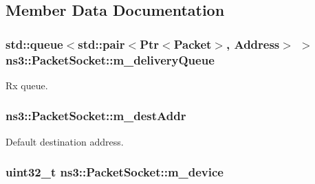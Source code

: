 \subsection{Member Data Documentation}
\subsubsection[{\texorpdfstring{m\+\_\+delivery\+Queue}{m_deliveryQueue}}]{\setlength{\rightskip}{0pt plus 5cm}std\+::queue$<$std\+::pair$<${\bf Ptr}$<${\bf Packet}$>$, {\bf Address}$>$ $>$ ns3\+::\+Packet\+Socket\+::m\+\_\+delivery\+Queue\hspace{0.3cm}{\ttfamily [private]}}\hypertarget{classns3_1_1PacketSocket_a436086ef3cbe575138ad46c14e58aa56}{}\label{classns3_1_1PacketSocket_a436086ef3cbe575138ad46c14e58aa56}


Rx queue. 

\subsubsection[{\texorpdfstring{m\+\_\+dest\+Addr}{m_destAddr}}]{ ns3\+::\+Packet\+Socket\+::m\+\_\+dest\+Addr\hspace{0.3cm}{\ttfamily [private]}}\hypertarget{classns3_1_1PacketSocket_a22323e0871995f6f217d647301923ceb}{}\label{classns3_1_1PacketSocket_a22323e0871995f6f217d647301923ceb}


Default destination address. 

\subsubsection[{\texorpdfstring{m\+\_\+device}{m_device}}]{\setlength{\rightskip}{0pt plus 5cm}uint32\+\_\+t ns3\+::\+Packet\+Socket\+::m\+\_\+device\hspace{0.3cm}{\ttfamily [private]}}\hypertarget{classns3_1_1PacketSocket_ad55c1b060ff4bce8e74e874c83cf88d3}{}\label{classns3_1_1PacketSocket_ad55c1b060ff4bce8e74e874c83cf88d3}


